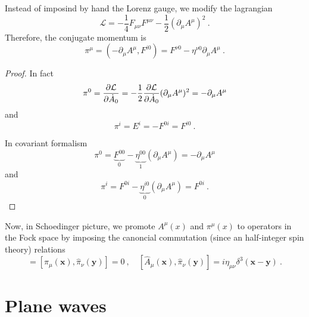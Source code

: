     Instead of imposind by hand the Lorenz gauge, we modify the lagrangian 
    \begin{equation*}
        \mathcal L = - \frac{1}{4} F_{\mu\nu} F^{\mu\nu} - \frac{1}{2} (\partial_\mu A^\mu)^2 ~. 
    \end{equation*}
    Therefore, the conjugate momentum is 
    \begin{equation*}
        \pi^\mu = (- \partial_\mu A^\mu, F^{i0}) = F^{\nu 0} - \eta^{\nu 0} \partial_\mu A^\mu ~.
    \end{equation*}
    \begin{proof}
        In fact 
        \begin{equation*}
            \pi^0 = \frac{\partial\mathcal L}{\partial\dot A_0} = - \frac{1}{2} \frac{\partial\mathcal L}{\partial\dot A_0} (\partial_\mu A^\mu)^2 = - \partial_\mu A^\mu 
        \end{equation*}
        and 
        \begin{equation*}
            \pi^i = E^i = - F^{0i} = F^{i0} ~.
        \end{equation*}

        In covariant formalism 
        \begin{equation*}
            \pi^0 = \underbrace{F^{00}}_0 - \underbrace{\eta^{00}}_1 (\partial_\mu A^\mu) = - \partial_\mu A^\mu 
        \end{equation*}
        and 
        \begin{equation*}
            \pi^i = F^{0i} - \underbrace{\eta^{i0}}_0 (\partial_\mu A^\mu) = F^{0i} ~.
        \end{equation*}
    \end{proof}

    Now, in Schoedinger picture, we promote $A^\mu(x)$ and $\pi^\mu(x)$ to operators in the Fock space by imposing the canoncial commutation (since an half-integer spin theory) relations 
    \begin{equation*}
        [\hat A_\mu (\mathbf x), \hat A_\nu (\mathbf y)] = [\hat \pi_\mu (\mathbf x), \hat \pi_\nu (\mathbf y)] = 0 ~, \quad [\hat A_\mu (\mathbf x), \hat \pi_\nu (\mathbf y)] = i \eta_{\mu\nu} \delta^3 (\mathbf x - \mathbf y) ~.
    \end{equation*}

\section{Plane waves} 

